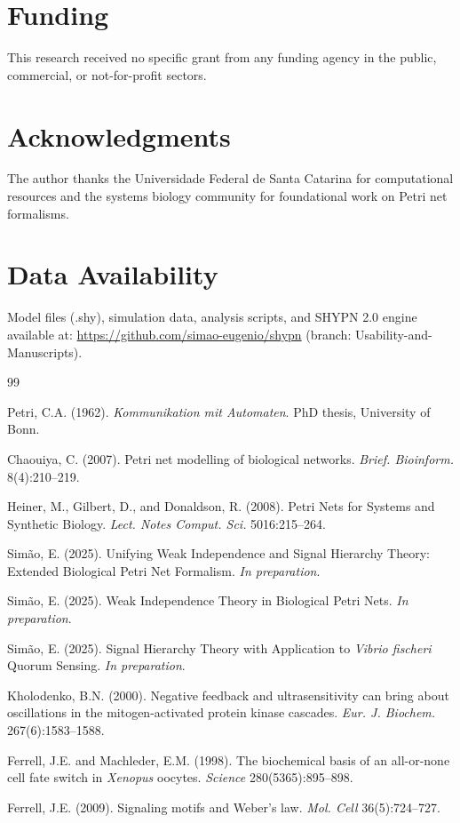 \documentclass[twocolumn,11pt]{article}
\begin{document}
\section*{Funding}

This research received no specific grant from any funding agency in the public, commercial, or not-for-profit sectors.

\section*{Acknowledgments}

The author thanks the Universidade Federal de Santa Catarina for computational resources and the systems biology community for foundational work on Petri net formalisms.

\section*{Data Availability}

Model files (.shy), simulation data, analysis scripts, and SHYPN 2.0 engine available at: \url{https://github.com/simao-eugenio/shypn} (branch: Usability-and-Manuscripts).


\begin{thebibliography}{99}
\setlength{\itemsep}{3pt}

Petri, C.A. (1962).
\newblock \textit{Kommunikation mit Automaten}.
\newblock PhD thesis, University of Bonn.

Chaouiya, C. (2007).
\newblock Petri net modelling of biological networks.
\newblock \textit{Brief. Bioinform.} 8(4):210--219.

Heiner, M., Gilbert, D., and Donaldson, R. (2008).
\newblock Petri Nets for Systems and Synthetic Biology.
\newblock \textit{Lect. Notes Comput. Sci.} 5016:215--264.

Simão, E. (2025).
\newblock Unifying Weak Independence and Signal Hierarchy Theory: Extended Biological Petri Net Formalism.
\newblock \textit{In preparation}.

Simão, E. (2025).
\newblock Weak Independence Theory in Biological Petri Nets.
\newblock \textit{In preparation}.

Simão, E. (2025).
\newblock Signal Hierarchy Theory with Application to \textit{Vibrio fischeri} Quorum Sensing.
\newblock \textit{In preparation}.

Kholodenko, B.N. (2000).
\newblock Negative feedback and ultrasensitivity can bring about oscillations in the mitogen-activated protein kinase cascades.
\newblock \textit{Eur. J. Biochem.} 267(6):1583--1588.

Ferrell, J.E. and Machleder, E.M. (1998).
\newblock The biochemical basis of an all-or-none cell fate switch in \textit{Xenopus} oocytes.
\newblock \textit{Science} 280(5365):895--898.

Ferrell, J.E. (2009).
\newblock Signaling motifs and Weber's law.
\newblock \textit{Mol. Cell} 36(5):724--727.

\end{thebibliography}
\end{document}
